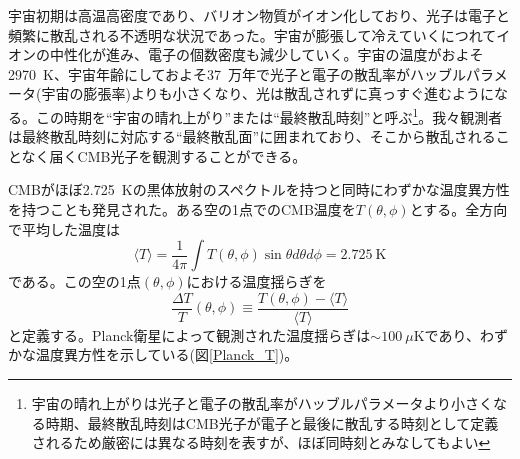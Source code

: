 宇宙初期は高温高密度であり、バリオン物質がイオン化しており、光子は電子と頻繁に散乱される不透明な状況であった。宇宙が膨張して冷えていくにつれてイオンの中性化が進み、電子の個数密度も減少していく。宇宙の温度がおよそ\SI{2970}{K}、宇宙年齢にしておよそ\SI{37}{万年}で光子と電子の散乱率がハッブルパラメータ(宇宙の膨張率)よりも小さくなり、光は散乱されずに真っすぐ進むようになる。この時期を``宇宙の晴れ上がり''または``最終散乱時刻''と呼ぶ\footnote{宇宙の晴れ上がりは光子と電子の散乱率がハッブルパラメータより小さくなる時期、最終散乱時刻はCMB光子が電子と最後に散乱する時刻として定義されるため厳密には異なる時刻を表すが、ほぼ同時刻とみなしてもよい}。我々観測者は最終散乱時刻に対応する``最終散乱面''に囲まれており、そこから散乱されることなく届くCMB光子を観測することができる。

CMBがほぼ\SI{2.725}{K}の黒体放射のスペクトルを持つと同時にわずかな温度異方性を持つことも発見された。ある空の1点でのCMB温度を$T(\theta,\phi)$とする。全方向で平均した温度は
\begin{equation}
  \langle T \rangle = \frac{1}{4\pi}\int T(\theta,\phi)\sin\theta d\theta d\phi = \SI{2.725}{\mathrm{K}}
\end{equation}
である。この空の1点$(\theta,\phi)$における温度揺らぎを
\begin{equation}
  \frac{\Delta T}{T}(\theta,\phi) \equiv \frac{T(\theta,\phi) - \langle T \rangle}{\langle T \rangle}
\end{equation}
と定義する。Planck衛星によって観測された温度揺らぎ\cite{Planck_T}は$\sim \SI{100}{\mu\mathrm{K}}$であり、わずかな温度異方性を示している(図\ref{Planck_T})。

